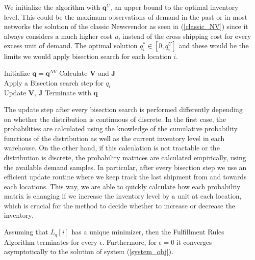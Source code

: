 \documentclass[poms,final,blindrev]{poms1_V1} %
\begin{document}
We initialize the algorithm with $\boldsymbol{q}^{U}$, an upper bound to the optimal inventory level. This could be the maximum observations of demand in the past or in most networks the solution of the classic Newsvendor as seen in (\ref{classic_NV}) since it always considers a much higher cost $u_i$ instead of the cross shipping cost for every excess unit of demand. The optimal solution $q^*_i \in [0,q^{U}_i]$ and these would be the limits we would apply bisection search for each location $i$.



\begin{algorithm}[ht]
	\SingleSpacedXII
	\begin{algorithmic}
		\State Initialize $\boldsymbol{q} = \boldsymbol{q}^{NV}$ 
		\State Calculate $\boldsymbol{V}$ and $\boldsymbol{J}$
		\\ \hspace{2cm} Apply a Bisection search step for $q_i$
		\\ \hspace{2cm} Update $\boldsymbol{V}$, $\boldsymbol{J}$
		\EndWhile 
		\EndFor 
		\EndWhile
	\State Terminate with $\boldsymbol{q}$  
	\end{algorithmic}
 \caption{fulfillment Rules Algorithm}
 \label{alg}
\end{algorithm}

The update step after every bisection search is performed differently depending on whether the distribution is continuous of discrete. In the first case, the probabilities are calculated using the knowledge of the cumulative probability functions of the distribution as well as the current inventory level in each warehouse. On the other hand, if this calculation is not tractable or the distribution is discrete, the probability matrices are calculated empirically, using the available demand samples. In particular,
after every bisection step we use an efficient update routine where we keep track the last shipment from and towards each locations. This way, we are able to quickly calculate how each probability matrix is changing if we increase the inventory level by a unit at each location, which is crucial for the method to decide whether to increase or decrease the inventory.

\begin{theorem}\label{Thm:conv}
	Assuming that $L_q[i]$ has a unique minimizer, then the Fulfillment Rules Algorithm terminates for every $\epsilon$. Furthermore, for $\epsilon=0$ it converges asymptotically to the solution of system (\ref{system_obj}). 
\end{theorem}
\end{document}
